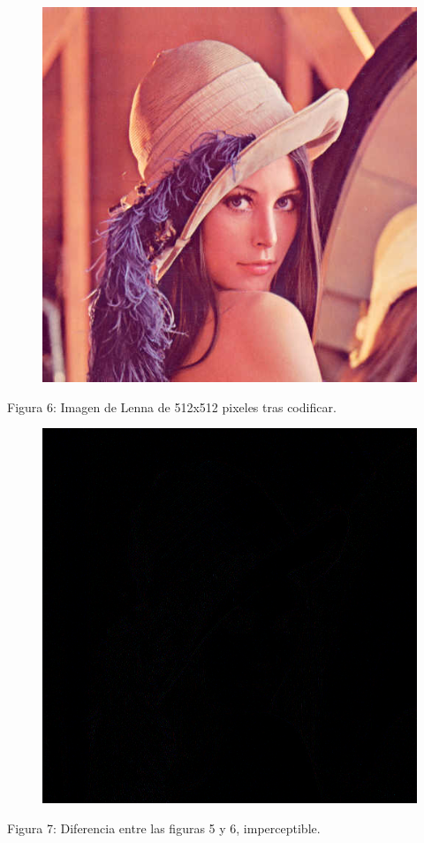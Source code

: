 \documentclass[%
final,
%
reprint,
%
notitlepage,
narroweqnarray,
inline,
twoside,
invited
]{ieee}
\begin{document}
\begin{thebibliography}{1}
\begin{figure}[H]
	\includegraphics[scale=0.7]{./img/lenaout.png}
\end{figure}
\begin{center}
\par Figura 6: Imagen de Lenna de 512x512 pixeles tras codificar.
\end{center}

\begin{figure}[H]
	\includegraphics[scale=0.7]{./img/lenadif.png}
\end{figure}
\begin{center}
\par Figura 7: Diferencia entre las figuras 5 y 6, imperceptible.
\end{center}


\end{thebibliography}
\end{document}
